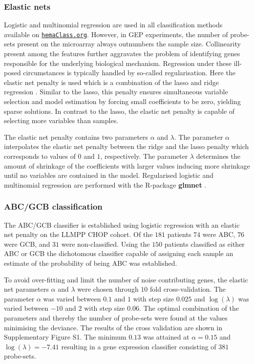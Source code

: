 \documentclass[twocolumn]{bmcart}%
\newcommand{\hemaClass}{\href{http://hemaClass.org}{\texttt{hemaClass.org}}}
\newcommand{\R}{\textsf{R}}
\newcommand{\pkg}[1]{\textbf{#1}}
\begin{document}
\subsubsection{Elastic nets}
Logistic and multinomial regression are used in all classification methods available on \hemaClass{}.
However, in GEP experiments, the number of probe-sets present on the microarray always outnumbers the sample size.
Collinearity present among the features further aggravates the problem of identifying genes responsible for the underlying biological mechanism.
Regression under these ill-posed circumstances is typically handled by so-called regularisation.
Here the elastic net penalty \cite{Friedman2010, Zou2005} is used which is a combination of the lasso \cite{Tibshirani1996} and ridge regression \cite{Hoerl1970}.
Similar to the lasso, this penalty ensures simultaneous variable selection and model estimation by forcing small coefficients to be zero, yielding sparse solutions.
In contrast to the lasso, the elastic net penalty is capable of selecting more variables than samples.

The elastic net penalty contains two parameters $\alpha$ and $\lambda$.
The parameter $\alpha$ interpolates the elastic net penalty between the ridge and the lasso penalty which corresponds to values of $0$ and $1$, respectively.
The parameter $\lambda$ determines the amount of shrinkage of the coefficients with larger values inducing more shrinkage until no variables are contained in the model.
Regularised logistic and multinomial regression are performed with the \R{}-package \pkg{glmnet} \cite{Friedman2010}.



\subsubsection{ABC/GCB classification}
The ABC/GCB classifier is established using logistic regression with an elastic net penalty on the LLMPP CHOP cohort.
Of the $181$ patients $74$ were ABC, $76$ were GCB, and $31$ were non-classified.
Using the $150$ patients classified as either ABC or GCB the dichotomous classifier capable of assigning each sample an estimate of the probability of being ABC was established.

To avoid over-fitting and limit the number of noise contributing genes, the elastic net parameters $\alpha$ and $\lambda$ were chosen through $10$ fold cross-validation.
The parameter $\alpha$ was varied between $0.1$ and $1$ with step size $0.025$ and $\log(\lambda)$ was varied between $-10$ and $2$ with step size $0.06$.
The optimal combination of the parameters and thereby the number of probe-sets were found at the values minimising the deviance.
The results of the cross validation are shown in Supplementary Figure S1.%
The minimum $0.13$ was attained at $\alpha = 0.15$ and $\log(\lambda) = -7.41$ resulting in a gene expression classifier consisting of $381$ probe-sets.
\end{document}
